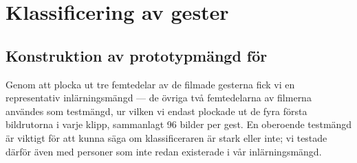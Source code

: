 \documentclass[../rapport_MVEX01-11-05]{subfiles}
\begin{document}
\section{Klassificering av gester} 

\subsection{Konstruktion av prototypmängd för \knn}

Genom att plocka ut tre femtedelar av de filmade gesterna fick vi en
representativ inlärningsmängd --- de övriga två femtedelarna av filmerna 
användes som testmängd, ur vilken vi endast plockade ut
de fyra första bildrutorna i varje klipp, sammanlagt 96 bilder per gest.
En oberoende testmängd är viktigt för att kunna säga om klassificeraren är
stark eller inte; vi testade därför även med personer som inte redan 
existerade i vår inlärningsmängd.

%
\end{document}
